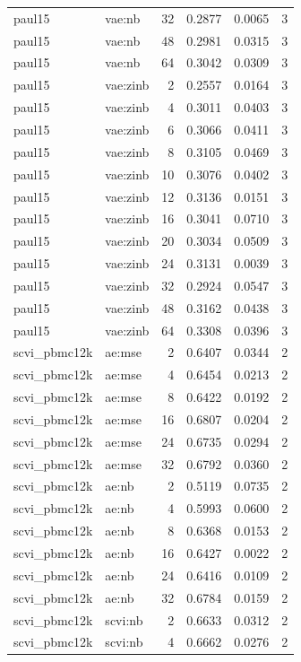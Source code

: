 \begin{tabular}{llrrrr}
paul15 & vae:nb & 32 & 0.2877 & 0.0065 & 3 \\
paul15 & vae:nb & 48 & 0.2981 & 0.0315 & 3 \\
paul15 & vae:nb & 64 & 0.3042 & 0.0309 & 3 \\
paul15 & vae:zinb & 2 & 0.2557 & 0.0164 & 3 \\
paul15 & vae:zinb & 4 & 0.3011 & 0.0403 & 3 \\
paul15 & vae:zinb & 6 & 0.3066 & 0.0411 & 3 \\
paul15 & vae:zinb & 8 & 0.3105 & 0.0469 & 3 \\
paul15 & vae:zinb & 10 & 0.3076 & 0.0402 & 3 \\
paul15 & vae:zinb & 12 & 0.3136 & 0.0151 & 3 \\
paul15 & vae:zinb & 16 & 0.3041 & 0.0710 & 3 \\
paul15 & vae:zinb & 20 & 0.3034 & 0.0509 & 3 \\
paul15 & vae:zinb & 24 & 0.3131 & 0.0039 & 3 \\
paul15 & vae:zinb & 32 & 0.2924 & 0.0547 & 3 \\
paul15 & vae:zinb & 48 & 0.3162 & 0.0438 & 3 \\
paul15 & vae:zinb & 64 & 0.3308 & 0.0396 & 3 \\
scvi\_pbmc12k & ae:mse & 2 & 0.6407 & 0.0344 & 2 \\
scvi\_pbmc12k & ae:mse & 4 & 0.6454 & 0.0213 & 2 \\
scvi\_pbmc12k & ae:mse & 8 & 0.6422 & 0.0192 & 2 \\
scvi\_pbmc12k & ae:mse & 16 & 0.6807 & 0.0204 & 2 \\
scvi\_pbmc12k & ae:mse & 24 & 0.6735 & 0.0294 & 2 \\
scvi\_pbmc12k & ae:mse & 32 & 0.6792 & 0.0360 & 2 \\
scvi\_pbmc12k & ae:nb & 2 & 0.5119 & 0.0735 & 2 \\
scvi\_pbmc12k & ae:nb & 4 & 0.5993 & 0.0600 & 2 \\
scvi\_pbmc12k & ae:nb & 8 & 0.6368 & 0.0153 & 2 \\
scvi\_pbmc12k & ae:nb & 16 & 0.6427 & 0.0022 & 2 \\
scvi\_pbmc12k & ae:nb & 24 & 0.6416 & 0.0109 & 2 \\
scvi\_pbmc12k & ae:nb & 32 & 0.6784 & 0.0159 & 2 \\
scvi\_pbmc12k & scvi:nb & 2 & 0.6633 & 0.0312 & 2 \\
scvi\_pbmc12k & scvi:nb & 4 & 0.6662 & 0.0276 & 2 \\

\end{tabular}
